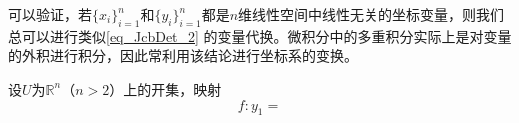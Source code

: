 可以验证，若$\{x_i\}^n_{i=1}$和$\{y_i\}^n_{i=1}$都是$n$维线性空间中线性无关的坐标变量，则我们总可以进行类似\autoref{eq_JcbDet_2} 的变量代换。微积分中的多重积分实际上是对变量的外积进行积分，因此常利用该结论进行坐标系的变换。

\begin{theorem}{}
设$U$为$\mathbb R^n$（$n>2$）上的开集，映射
\begin{equation}
f:y_1=
\end{equation}
\end{theorem}

